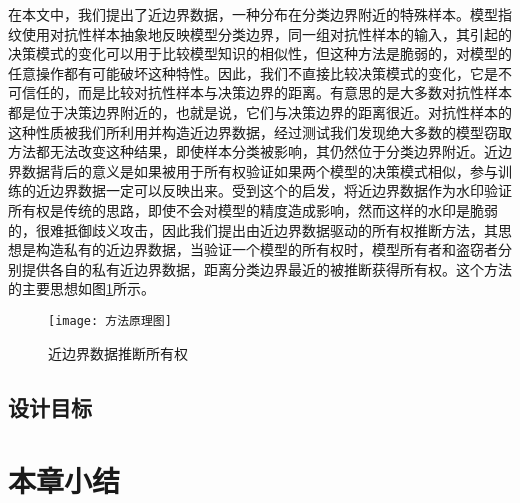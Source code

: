 在本文中，我们提出了近边界数据，一种分布在分类边界附近的特殊样本。模型指纹\cite{cao2021ipguard}使用对抗性样本抽象地反映模型分类边界，同一组对抗性样本的输入，其引起的决策模式的变化可以用于比较模型知识的相似性，但这种方法是脆弱的，对模型的任意操作都有可能破坏这种特性。因此，我们不直接比较决策模式的变化，它是不可信任的，而是比较对抗性样本与决策边界的距离。有意思的是大多数对抗性样本都是位于决策边界附近的，也就是说，它们与决策边界的距离很近。对抗性样本的这种性质被我们所利用并构造近边界数据，经过测试我们发现绝大多数的模型窃取方法都无法改变这种结果，即使样本分类被影响，其仍然位于分类边界附近。近边界数据背后的意义是如果被用于所有权验证如果两个模型的决策模式相似，参与训练的近边界数据一定可以反映出来。受到这个的启发，将近边界数据作为水印验证所有权是传统的思路，即使不会对模型的精度造成影响，然而这样的水印是脆弱的，很难抵御歧义攻击，因此我们提出由近边界数据驱动的所有权推断方法，其思想是构造私有的近边界数据，当验证一个模型的所有权时，模型所有者和盗窃者分别提供各自的私有近边界数据，距离分类边界最近的被推断获得所有权。这个方法的主要思想如图\ref{方法原理图}所示。
\begin{figure}[htbp]%
	\centering
	\texttt{[image: 方法原理图]}
	\caption{近边界数据推断所有权}
	\label{方法原理图}
\end {figure}

\subsection{设计目标}




\section{本章小结}
